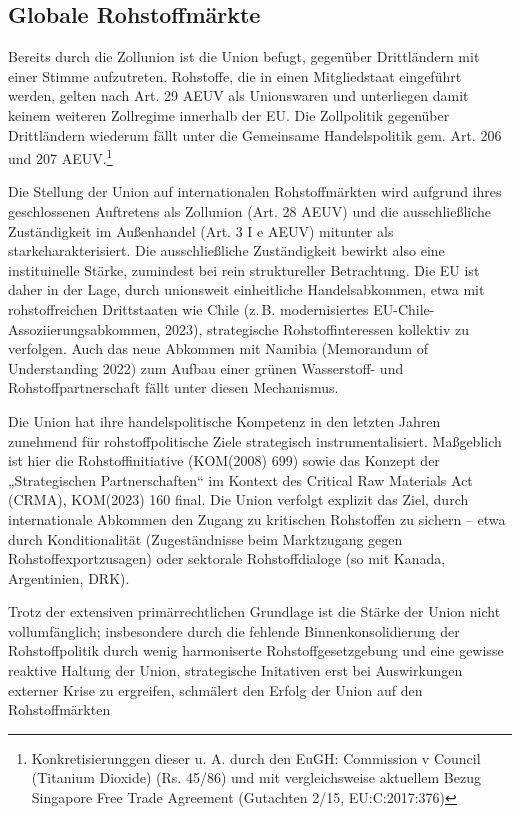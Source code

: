 \documentclass[12pt,a4paper,oneside]{book} %
\begin{document}
{\subsection{Globale Rohstoffmärkte}

Bereits durch die Zollunion ist die Union befugt, gegenüber Drittländern mit einer Stimme aufzutreten. Rohstoffe, die in einen Mitgliedstaat eingeführt werden, gelten nach Art. 29 AEUV als Unionswaren und unterliegen damit keinem weiteren Zollregime innerhalb der EU. Die Zollpolitik gegenüber Drittländern wiederum fällt unter die Gemeinsame Handelspolitik gem. Art. 206 und 207 AEUV.\footnote{Konkretisierunggen dieser u. A. durch den EuGH: Commission v Council (Titanium Dioxide) (Rs. 45/86) und mit vergleichsweise aktuellem Bezug Singapore Free Trade Agreement (Gutachten 2/15, EU:C:2017:376)}

Die Stellung der Union auf internationalen Rohstoffmärkten wird aufgrund ihres geschlossenen Auftretens als Zollunion (Art. 28 AEUV) und die ausschließliche Zuständigkeit im Außenhandel (Art. 3 I e AEUV) mitunter als \glqq stark\grqq charakterisiert.\autocite{Schorkopf, Rohstoffverwaltung, Rn. 34.} Die ausschließliche Zuständigkeit bewirkt also eine instituinelle Stärke, zumindest bei rein struktureller Betrachtung. Die EU ist daher in der Lage, durch unionsweit einheitliche Handelsabkommen, etwa mit rohstoffreichen Drittstaaten wie Chile (z. B. modernisiertes EU-Chile-Assoziierungsabkommen, 2023), strategische Rohstoffinteressen kollektiv zu verfolgen. Auch das neue Abkommen mit Namibia (Memorandum of Understanding 2022) zum Aufbau einer grünen Wasserstoff- und Rohstoffpartnerschaft fällt unter diesen Mechanismus.

Die Union hat ihre handelspolitische Kompetenz in den letzten Jahren zunehmend für rohstoffpolitische Ziele strategisch instrumentalisiert. Maßgeblich ist hier die Rohstoffinitiative (KOM(2008) 699) sowie das Konzept der „Strategischen Partnerschaften“ im Kontext des Critical Raw Materials Act (CRMA), KOM(2023) 160 final. Die Union verfolgt explizit das Ziel, durch internationale Abkommen den Zugang zu kritischen Rohstoffen zu sichern -- etwa durch Konditionalität (Zugeständnisse beim Marktzugang gegen Rohstoffexportzusagen) oder sektorale Rohstoffdialoge (so mit Kanada, Argentinien, DRK).

Trotz der extensiven primärrechtlichen Grundlage ist die Stärke der Union nicht vollumfänglich; insbesondere durch die fehlende Binnenkonsolidierung der Rohstoffpolitik durch wenig harmoniserte Rohstoffgesetzgebung und eine gewisse reaktive Haltung der Union, strategische Initativen erst bei Auswirkungen externer Krise zu ergreifen, schmälert den Erfolg der Union auf den Rohstoffmärkten


}
\end{document}
